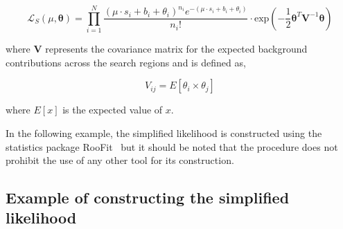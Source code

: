\begin{equation}
\mathcal{L}_{S}(\mu, \boldsymbol{\theta}) =  \prod_{i=1}^{N} \dfrac{(\mu \cdot s_{i}+b_{i}+\theta_{i})^{n_{i}} e^{-(\mu \cdot s_{i}+b_{i}+\theta_{i})} }{n_{i}!} \cdot  
\mathrm{exp}\left(-\dfrac{1}{2} \boldsymbol{\theta}^{T}\mathrm{\mathbf{V}}^{-1}\boldsymbol{\theta} \right)
\label{eq:full-likelihood}
\end{equation}

where $\mathrm{\mathbf{V}}$ represents the covariance matrix for the expected background contributions across the search regions and is defined as, 

\begin{equation}
V_{ij}=E[\theta_i\times\theta_j]
\label{eq-cov}
\end{equation}

where $E[x]$ is the expected value of $x$.

In the following example, the simplified likelihood is constructed using the statistics package {\sc RooFit}~\cite{roofit} but it should be noted that 
the procedure does not prohibit the use of any other tool for its construction. 

\subsection{Example of constructing the simplified likelihood}
\label{sec:sl-toy}

